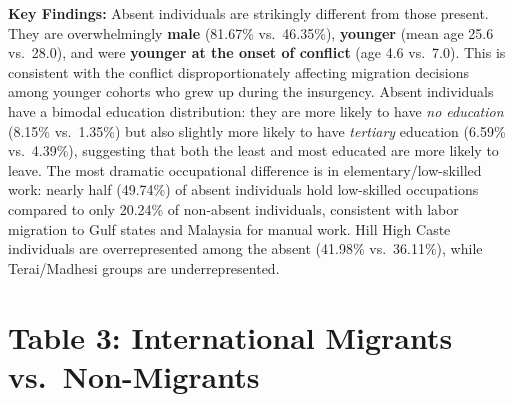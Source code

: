 \documentclass[12pt,letterpaper]{article}
\begin{document}
\noindent\textbf{Key Findings:} Absent individuals are strikingly different from those present. They are overwhelmingly \textbf{male} (81.67\% vs.\ 46.35\%), \textbf{younger} (mean age 25.6 vs.\ 28.0), and were \textbf{younger at the onset of conflict} (age 4.6 vs.\ 7.0). This is consistent with the conflict disproportionately affecting migration decisions among younger cohorts who grew up during the insurgency. Absent individuals have a bimodal education distribution: they are more likely to have \textit{no education} (8.15\% vs.\ 1.35\%) but also slightly more likely to have \textit{tertiary} education (6.59\% vs.\ 4.39\%), suggesting that both the least and most educated are more likely to leave. The most dramatic occupational difference is in elementary/low-skilled work: nearly half (49.74\%) of absent individuals hold low-skilled occupations compared to only 20.24\% of non-absent individuals, consistent with labor migration to Gulf states and Malaysia for manual work. Hill High Caste individuals are overrepresented among the absent (41.98\% vs.\ 36.11\%), while Terai/Madhesi groups are underrepresented.


\section{Table 3: International Migrants vs.\ Non-Migrants}
\end{document}
